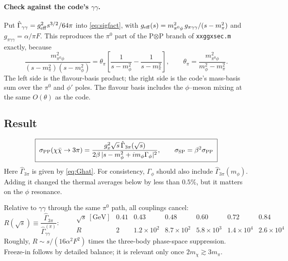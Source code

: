 \documentclass{article}
\newcommand{\mpi}{m_\pi}
\begin{document}
\paragraph{Check against the code's $\gamma\gamma$.}
Put $\hat\Gamma_{\gamma\gamma}=g_{\rm eff}^2s^{3/2}/64\pi$ into \eqref{eq:sigfact}, with
$g_{\rm eff}(s)=m^2_{\pi^0\phi}\,g_{\pi\gamma\gamma}/(s-\mpi^2)$ and
$g_{\pi\gamma\gamma}=\alpha/\pi F$. This reproduces the $\pi^0$ part of the P$\otimes$P branch of
\texttt{xxggxsec.m} exactly, because
\begin{equation}
  \frac{m^2_{\pi^0\phi}}{(s-\mpi^2)(s-m_\phi^2)}
  =\theta_\pi\left[\frac{1}{s-m_\phi^2}-\frac{1}{s-\mpi^2}\right],\qquad
  \theta_\pi=\frac{m^2_{\pi^0\phi}}{m_\phi^2-\mpi^2}.
\end{equation}
The left side is the flavour-basis product; the right side is the code's mass-basis sum over the
$\pi^0$ and $\phi'$ poles. The flavour basis includes the $\phi$--meson mixing at the same
$O(\theta)$ as the code.

\subsection{Result}

\begin{equation}
  \boxed{\;\sigma_{\rm PP}(\chi\bar\chi\to3\pi)=\frac{g_x^2\sqrt s\,\hat\Gamma_{3\pi}(\sqrt s)}
  {2\beta\,|s-m_\phi^2+im_\phi\Gamma_\phi|^2},\qquad \sigma_{\rm SP}=\beta^2\sigma_{\rm PP}\;}
\end{equation}
Here $\hat\Gamma_{3\pi}$ is given by \eqref{eq:Ghat}. For consistency, $\Gamma_\phi$ should also
include $\hat\Gamma_{3\pi}(m_\phi)$. Adding it changed the thermal averages below by less than
$0.5\%$, but it matters on the $\phi$ resonance.

Relative to $\gamma\gamma$ through the same $\pi^0$ path, all couplings cancel:
\begin{equation}
  R(\sqrt s)\equiv\frac{\hat\Gamma_{3\pi}}{\hat\Gamma^{(\pi)}_{\gamma\gamma}}:\qquad
  \begin{array}{c|cccccc}
    \sqrt s~[\mathrm{GeV}] & 0.41 & 0.43 & 0.48 & 0.60 & 0.72 & 0.84\\\hline
    R & 2 & 1.2\times10^2 & 8.7\times10^2 & 5.8\times10^3 & 1.4\times10^4 & 2.6\times10^4
  \end{array}
\end{equation}
Roughly, $R\sim s/(16\alpha^2F^2)$ times the three-body phase-space suppression. Freeze-in follows
by detailed balance; it is relevant only once $2m_\chi\gtrsim3\mpi$.
\end{document}

